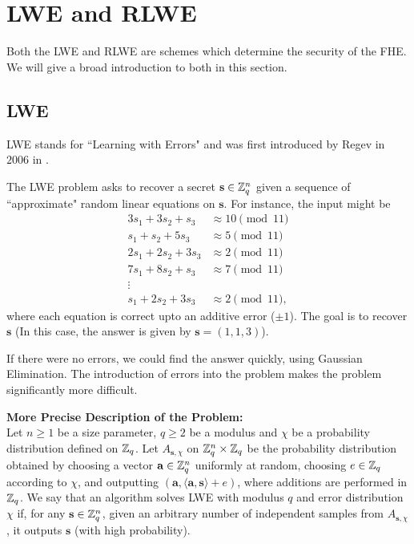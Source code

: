 \documentclass[12pt]{article}
\theoremstyle{plain}
\theoremstyle{definition}
\theoremstyle{remark}
\begin{document}
\section{LWE and RLWE}
Both the LWE and RLWE are schemes which determine the security of the FHE. We will give a broad introduction to both in this section.
\subsection{LWE}
LWE stands for ``Learning with Errors" and was first introduced by Regev in $2006$ in \cite{LWE}.

The LWE problem asks to recover a secret $\mathbf{s} \in \mathbb{Z}_q^n$ given a sequence of ``approximate"
random linear equations on $\mathbf{s}$. For instance, the input might be
\begin{align*}
3s_1 + 3s_2 + s_3 & \approx 10 \pmod{11}\\
s_1 + s_2 + 5s_3  & \approx 5 \pmod{11}\\
2s_1 + 2s_2 + 3s_3 & \approx 2 \pmod{11} \\
7s_1 + 8s_2 + s_3 & \approx 7 \pmod{11} \\
\vdots \\
s_1 + 2s_2 + 3s_3 & \approx 2 \pmod{11},
\end{align*}
where each equation is correct upto an additive error ($\pm 1$). The goal is to recover $\mathbf{s}$ (In this case, the answer is given by $\mathbf{s}=(1,1,3)$).

If there were no errors, we could find the answer quickly, using Gaussian Elimination. The introduction of errors into the problem makes the problem significantly more difficult.

\bigskip
\noindent
{\bf More Precise Description of the Problem:}
\\
Let $n\geq 1$ be a size parameter, $q\geq 2$ be a modulus and $\mathcal{\chi}$ be a probability distribution defined on $\mathbb{Z}_q$. Let $A_{\mathbf{s},\mathcal{\chi}}$ on $\mathbb{Z}_q^n\times  \mathbb{Z}_q$ be the probability distribution
obtained by choosing a vector $\mathbf{a} \in \mathbb{Z}_q^n$
uniformly at random, choosing $e \in \mathbb{Z}_q$ according to $\mathcal{\chi}$, and outputting $(\mathbf{a},\langle \mathbf{a},\mathbf{s}\rangle + e)$, where additions are performed in $\mathbb{Z}_q$. We say that
an algorithm solves LWE with modulus $q$ and error distribution $\mathcal{\chi}$ if, for any $\mathbf{s} \in \mathbb{Z}_q^n$, given an
arbitrary number of independent samples from $A_{\mathbf{s},\mathcal{\chi}}$, it outputs $\mathbf{s}$ (with high probability).
\end{document}
